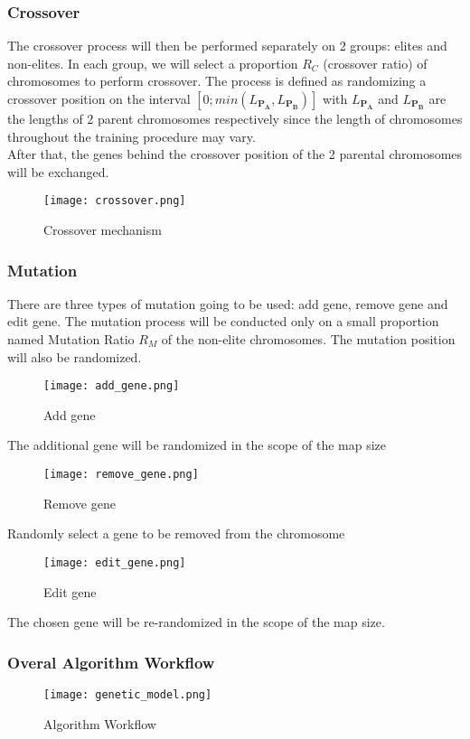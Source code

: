   \subsubsection*{Crossover}
  The crossover process will then be performed separately on 2 groups: elites and non-elites.
  In each group, we will select a proportion $R_C$ (crossover ratio) of chromosomes to perform crossover. The process is defined as randomizing a crossover position on the interval $\left[0; min(L_{\mathbf{P_A}}, L_{\mathbf{P_B}})\right]$ with $L_\mathbf{P_A}$ and $L_\mathbf{P_B}$ are the lengths of 2 parent chromosomes respectively since the length of chromosomes throughout the training procedure may vary.\\
After that, the genes behind the crossover position of the 2 parental chromosomes will be exchanged.
  \begin{figure}[H]
    \centering
    \texttt{[image: crossover.png]}
    \caption{Crossover mechanism}
  \end{figure}

  \subsubsection*{Mutation}
  There are three types of mutation going to be used: add gene, remove gene and edit gene. The mutation process will be conducted only on a small proportion named Mutation Ratio $R_M$ of the non-elite chromosomes. The mutation position will also be randomized.
  \begin{figure}[H]
    \centering
    \texttt{[image: add\_gene.png]}
    \caption{Add gene}
  \end{figure}
  The additional gene will be randomized in the scope of the map size
  \begin{figure}[H]
    \centering
    \texttt{[image: remove\_gene.png]}
    \caption{Remove gene}
  \end{figure}
  Randomly select a gene to be removed from the chromosome
  \begin{figure}[H]
    \centering
    \texttt{[image: edit\_gene.png]}
    \caption{Edit gene}
  \end{figure}
  The chosen gene will be re-randomized in the scope of the map size.

  \subsubsection{Overal Algorithm Workflow}
  \begin{figure}[H]
    \centering
    \texttt{[image: genetic\_model.png]}
    \caption{Algorithm Workflow}
  \end{figure}

